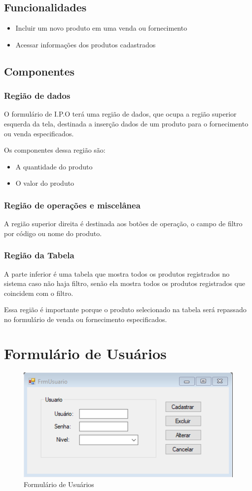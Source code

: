 \documentclass[
	article,			%
	12pt,				%
	oneside,			%
	a4paper,			%
	english,			%
	brazil,				%
	sumario=tradicional
	]{abntex2}
\begin{document}
		\subsection{Funcionalidades}
		\begin{itemize}
			\item Incluir um novo produto em uma venda ou fornecimento
			\item Acessar informações dos produtos cadastrados
		\end{itemize}
		\subsection{Componentes}
			\subsubsection{Região de dados}
			O formulário de I.P.O terá uma região de dados, que ocupa a região superior esquerda da tela, destinada a inserção dados de um produto para o fornecimento ou venda especificados. 
			
			Os componentes dessa região são:
			\begin{itemize}\itemsep1.5pt
				\item A quantidade do produto
				\item O valor do produto
			\end{itemize}	
			\subsubsection{Região de operações e miscelânea}
			A região superior direita é destinada aos botões de operação, o campo de filtro por código ou nome do produto.
			\subsubsection{Região da Tabela}
			A parte inferior é uma tabela que mostra todos os produtos registrados no sistema caso não haja filtro, senão ela mostra todos os produtos registrados que coincidem com o filtro.
			
			Essa região é importante porque o produto selecionado na tabela será repassado no formulário de venda ou fornecimento especificados.
	\newpage
	\section{Formulário de Usuários}
		\begin{figure}[!htb]
			\centering
			\includegraphics[scale=1.3]{./Figuras/FrmUsuario.png}
			\caption{Formulário de Usuários}
		\end{figure}
\end{document}

